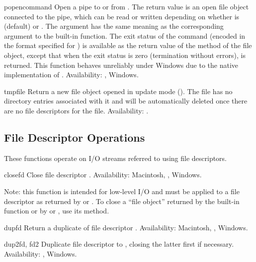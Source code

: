\begin{funcdesc}{popen}{command}
Open a pipe to or from .  The return value is an open
file object connected to the pipe, which can be read or written
depending on whether  is  (default) or .
The  argument has the same meaning as the corresponding
argument to the built-in  function.  The exit status of
the command (encoded in the format specified for ) is
available as the return value of the  method of the file
object, except that when the exit status is zero (termination without
errors),  is returned.   This function
behaves unreliably under Windows due to the native implementation of
.
Availability: \UNIX{}, Windows.
\end{funcdesc}

\begin{funcdesc}{tmpfile}{}
Return a new file object opened in update mode ().  The file
has no directory entries associated with it and will be automatically
deleted once there are no file descriptors for the file.
Availability: \UNIX{}.
\end{funcdesc}


\subsection{File Descriptor Operations \label{os-fd-ops}}

These functions operate on I/O streams referred to
using file descriptors.


\begin{funcdesc}{close}{fd}
Close file descriptor .
Availability: Macintosh, \UNIX{}, Windows.

Note: this function is intended for low-level I/O and must be applied
to a file descriptor as returned by  or
.  To close a ``file object'' returned by the
built-in function  or by  or
, use its  method.
\end{funcdesc}

\begin{funcdesc}{dup}{fd}
Return a duplicate of file descriptor .
Availability: Macintosh, \UNIX{}, Windows.
\end{funcdesc}

\begin{funcdesc}{dup2}{fd, fd2}
Duplicate file descriptor  to , closing the latter
first if necessary.
Availability: \UNIX{}, Windows.
\end{funcdesc}

